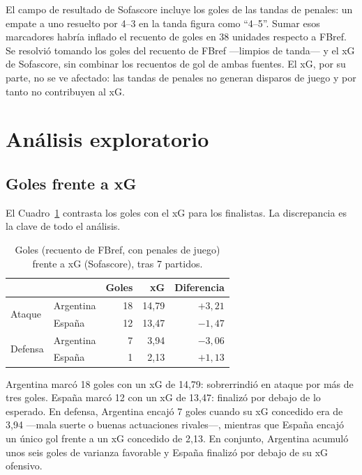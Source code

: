 \documentclass[11pt,a4paper]{article}
\begin{document}
El campo de resultado de Sofascore incluye los goles de las tandas de penales: un empate a uno resuelto por 4--3 en la tanda figura como ``4--5''. Sumar esos marcadores habría inflado el recuento de goles en 38 unidades respecto a FBref. Se resolvió tomando los goles del recuento de FBref ---limpios de tanda--- y el xG de Sofascore, sin combinar los recuentos de gol de ambas fuentes. El xG, por su parte, no se ve afectado: las tandas de penales no generan disparos de juego y por tanto no contribuyen al xG.

\section{Análisis exploratorio}

\subsection{Goles frente a xG}

El Cuadro~\ref{tab:vsxg} contrasta los goles con el xG para los finalistas. La discrepancia es la clave de todo el análisis.

\begin{table}[htbp]
\centering
\caption{Goles (recuento de FBref, con penales de juego) frente a xG (Sofascore), tras 7 partidos.}
\label{tab:vsxg}
\begin{tabular}{llrrr}
\toprule
& & \textbf{Goles} & \textbf{xG} & \textbf{Diferencia} \\
\midrule
\multirow{2}{*}{Ataque} & Argentina & 18 & 14{,}79 & $+3{,}21$ \\
 & España & 12 & 13{,}47 & $-1{,}47$ \\
\midrule
\multirow{2}{*}{Defensa} & Argentina & 7 & 3{,}94 & $-3{,}06$ \\
 & España & 1 & 2{,}13 & $+1{,}13$ \\
\bottomrule
\end{tabular}
\end{table}

Argentina marcó 18 goles con un xG de 14{,}79: sobrerrindió en ataque por más de tres goles. España marcó 12 con un xG de 13{,}47: finalizó por debajo de lo esperado. En defensa, Argentina encajó 7 goles cuando su xG concedido era de 3{,}94 ---mala suerte o buenas actuaciones rivales---, mientras que España encajó un único gol frente a un xG concedido de 2{,}13. En conjunto, Argentina acumuló unos seis goles de varianza favorable y España finalizó por debajo de su xG ofensivo.
\end{document}
